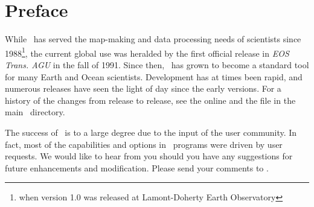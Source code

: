 %
%
\chapter{Preface} 
\thispagestyle{headings}

While \GMT\ has served the map-making and data processing needs of scientists since 1988\footnote{when
version 1.0 was released at Lamont-Doherty Earth Observatory}, the current global use was
heralded by the first official release in {\it EOS Trans. AGU} in the fall of 1991.  Since then,
\GMT\ has grown to become a standard tool for many Earth and Ocean scientists.  Development
has at times been rapid, and numerous releases have seen the light of day since the early versions.
For a history of the changes from release to release, see the online
and the file  in the main \GMT\ directory.

The success of \GMT\ is to a large degree due to the input of the user community. In fact, most of the
capabilities and options in \GMT\ programs were driven by user requests.
We would like to hear from you should you have any suggestions for future enhancements and modification.
Please send your comments to
.
